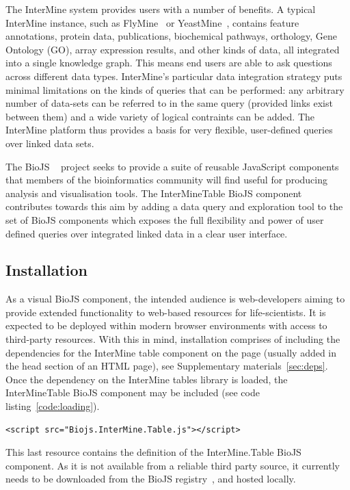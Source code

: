 \documentclass[10pt,a4paper,twocolumn]{article}
\begin{document}
The InterMine system provides users with a number of benefits. A typical
InterMine instance, such as FlyMine~\cite{flymine} or
YeastMine~\cite{yeastmine}, contains feature annotations, protein data,
publications, biochemical pathways, orthology, Gene Ontology (GO), array
expression results, and other kinds of data, all integrated into a single
knowledge graph. This means end users are able to ask questions across different
data types. InterMine's particular data integration strategy puts minimal
limitations on the kinds of queries that can be performed: any arbitrary number
of data-sets can be referred to in the same query (provided links exist between
them) and a wide variety of logical contraints can be added. The InterMine
platform thus provides a basis for very flexible, user-defined
queries over linked data sets. 

The BioJS ~\cite{biojs} project seeks to provide a suite of reusable JavaScript
components that members of the bioinformatics community will find useful for
producing analysis and visualisation tools. The InterMineTable BioJS component
contributes towards this aim by adding a data query and exploration tool to the
set of BioJS components which exposes the full flexibility and power of user
defined queries over integrated linked data in a clear user interface.

\subsection*{Installation}

As a visual BioJS component, the intended audience is web-developers aiming to
provide extended functionality to web-based resources for life-scientists. It is
expected to be deployed within modern browser environments with access to
third-party resources. With this in mind, installation comprises of including
the dependencies for the InterMine table component on the page (usually added in
the head section of an HTML page), see Supplementary materials~\ref{sec:deps}. Once the
dependency on the InterMine tables library is loaded, the InterMineTable BioJS
component may be included (see code listing~\ref{code:loading}).

\begin{lstlisting}[caption={Loading the BioJS InterMine Table library}, label={code:loading}]
<script src="Biojs.InterMine.Table.js"></script>
\end{lstlisting}

This last resource contains the definition of the InterMine.Table BioJS
component. As it is not available from a reliable third party source, it
currently needs to be downloaded from the BioJS
registry~\cite{site:biojs-registry}, and hosted locally.
\end{document}
